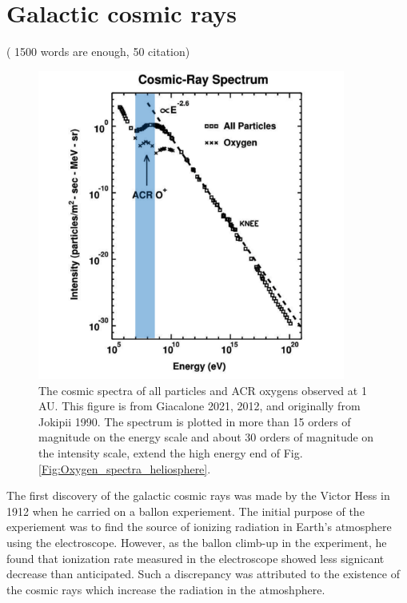 \section{Galactic cosmic rays} ( 1500 words are enough, 50 citation)

\begin{figure}
	\centering
	\includegraphics[width = 0.9\textwidth]{images/gcr_spectra_shadow.png}
	
	\caption{The cosmic spectra of all particles and ACR oxygens observed at 1 AU. This figure is from Giacalone 2021, 2012, and originally from Jokipii 1990.
	The spectrum is plotted in more than 15 orders of magnitude on the energy scale and about 30 orders of magnitude on the intensity scale, extend the high energy end of Fig.\ref{Fig:Oxygen_spectra_heliosphere}.}
	\label{Fig:Oxygen_spectra_cosmic_ray}
\end{figure}
The first discovery of the galactic cosmic rays was made by the Victor Hess in 1912 when he carried on a ballon experiement. The initial purpose of the experiement was to find the source of ionizing radiation in Earth's atmosphere using the electroscope. However, as the ballon climb-up in the experiment, he found that ionization rate measured in the electroscope showed less signicant decrease than anticipated. Such a discrepancy was attributed to the existence of the cosmic rays which increase the radiation in the atmoshphere.

